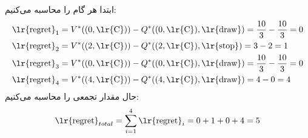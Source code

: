 \begin{ابجد}
\item ابتدا  هر گام را محاسبه می‌کنیم:
\begin{align*}
     & \text{\lr{regret}}_1 = V^*((0, \text{\lr{C}})) - Q^*((0, \text{\lr{C}}), \text{\lr{draw}}) = \frac{10}{3} - \frac{10}{3} = 0 \\
     & \text{\lr{regret}}_2 = V^*((2, \text{\lr{C}})) - Q^*((2, \text{\lr{C}}), \text{\lr{stop}}) = 3 - 2 = 1                       \\
     & \text{\lr{regret}}_3 = V^*((0, \text{\lr{C}})) - Q^*((0, \text{\lr{C}}), \text{\lr{draw}}) = \frac{10}{3} - \frac{10}{3} = 0 \\
     & \text{\lr{regret}}_4 = V^*((4, \text{\lr{C}})) - Q^*((4, \text{\lr{C}}), \text{\lr{draw}}) = 4 - 0 = 4
\end{align*}
حال مقدار  تجمعی را محاسبه می‌کنیم:
\begin{align*}
    \text{\lr{regret}}_{total} = \sum_{i = 1}^4 \text{\lr{regret}}_i = 0 + 1 + 0 + 4 = 5
\end{align*}

\end{ابجد}